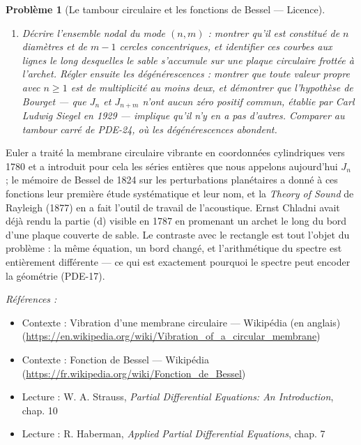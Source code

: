 \documentclass[11pt]{article}
\newtheorem{problem}{Problème}
\newenvironment{refs}{\par\small\noindent\emph{Références :}\begin{itemize}\setlength\itemsep{0pt}}{\end{itemize}\normalsize}
\begin{document}
\begin{problem}[{Le tambour circulaire et les fonctions de Bessel --- Licence}]
\begin{enumerate}
PDE-06, dont les harmoniques sont des multiples exacts du fondamental --- et expliquer ce que cela
signifie pour l'oreille.
\item[(d)] Décrire l'ensemble nodal du mode $(n,m)$ : montrer qu'il est constitué de $n$ diamètres
et de $m-1$ cercles concentriques, et identifier ces courbes aux lignes le long desquelles le
sable s'accumule sur une plaque circulaire frottée à l'archet. Régler ensuite les dégénérescences :
montrer que toute valeur propre avec $n \ge 1$ est de multiplicité au moins deux, et démontrer
que l'hypothèse de Bourget --- que $J_n$ et $J_{n+m}$ n'ont aucun zéro positif commun, établie
par Carl Ludwig Siegel en 1929 --- implique qu'il n'y en a pas d'autres. Comparer au tambour carré
de PDE-24, où les dégénérescences abondent.
\end{enumerate}

\end{problem}

\noindent Euler a traité la membrane circulaire vibrante en coordonnées cylindriques
vers 1780 et a introduit pour cela les séries entières que nous appelons aujourd'hui $J_n$ ; le
mémoire de Bessel de 1824 sur les perturbations planétaires a donné à ces fonctions leur première
étude systématique et leur nom, et la \textit{Theory of Sound} de Rayleigh (1877) en a fait l'outil
de travail de l'acoustique. Ernst Chladni avait déjà rendu la partie (d) visible en 1787 en
promenant un archet le long du bord d'une plaque couverte de sable. Le contraste avec le rectangle
est tout l'objet du problème : la même équation, un bord changé, et l'arithmétique du spectre est
entièrement différente --- ce qui est exactement pourquoi le spectre peut encoder la géométrie
(PDE-17).

\begin{refs}
\item Contexte : Vibration d'une membrane circulaire --- Wikipédia (en anglais) (\url{https://en.wikipedia.org/wiki/Vibration_of_a_circular_membrane})
\item Contexte : Fonction de Bessel --- Wikipédia (\url{https://fr.wikipedia.org/wiki/Fonction_de_Bessel})
\item Lecture : W. A. Strauss, \textit{Partial Differential Equations: An Introduction}, chap. 10
\item Lecture : R. Haberman, \textit{Applied Partial Differential Equations}, chap. 7
\end{refs}

\bigskip
\end{document}
